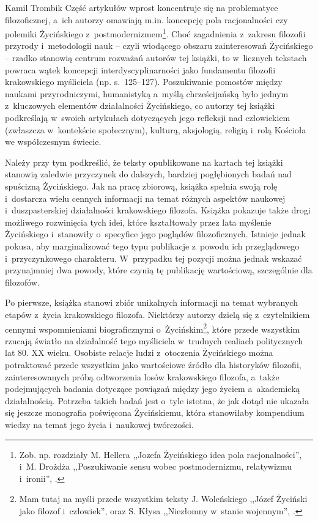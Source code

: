 \begin{recplenv}{Kamil Trombik}
Część artykułów wprost koncentruje się na problematyce filozoficznej, a~ich autorzy omawiają m.in. koncepcję pola racjonalności czy polemiki Życińskiego z~postmodernizmem\footnote{Zob. np. rozdziały M. Hellera ,,Jozefa Życińskiego idea pola racjonalności'',
\parencite[][]{heller_jozefa_2017}%
 i~M. Drożdża ,,Poszukiwanie sensu wobec postmodernizmu, relatywizmu i~ironii'', 
\parencite[][]{drozdz_poszukiwanie_2017}.%
}. Choć zagadnienia z~zakresu filozofii przyrody i~metodologii nauk -- czyli wiodącego obszaru zainteresowań Życińskiego -- rzadko stanowią centrum rozważań autorów tej książki, to w~licznych tekstach powraca wątek koncepcji interdyscyplinarności jako fundamentu filozofii krakowskiego myśliciela (np. s.~125–127). Poszukiwanie pomostów między naukami przyrodniczymi, humanistyką a~myślą chrześcijańską było jednym z~kluczowych elementów działalności Życińskiego, co autorzy tej książki podkreślają w~swoich artykułach dotyczących jego refleksji nad człowiekiem (zwłaszcza w~kontekście społecznym), kulturą, aksjologią, religią i~rolą Kościoła we współczesnym świecie.

Należy przy tym podkreślić, że teksty opublikowane na kartach tej książki stanowią zaledwie przyczynek do dalszych, bardziej pogłębionych badań nad spuścizną Życińskiego. Jak na pracę zbiorową, książka spełnia swoją rolę i~dostarcza wielu cennych informacji na temat różnych aspektów naukowej i~duszpasterskiej działalności krakowskiego filozofa. Książka pokazuje także drogi możliwego rozwinięcia tych idei, które kształtowały przez lata myślenie Życińskiego i~stanowiły o~specyfice jego poglądów filozoficznych. Istnieje jednak pokusa, aby marginalizować tego typu publikacje z~powodu ich przeglądowego i~przyczynkowego charakteru. W~przypadku tej pozycji można jednak wskazać przynajmniej dwa powody, które czynią tę publikację wartościową, szczególnie dla filozofów.

Po pierwsze, książka stanowi zbiór unikalnych informacji na temat wybranych etapów z~życia krakowskiego filozofa. Niektórzy autorzy dzielą się z~czytelnikiem cennymi wspomnieniami biograficznymi o~Życińskim\footnote{Mam tutaj na myśli przede wszystkim teksty J. Woleńskiego ,,Józef Życiński jako filozof i~człowiek'', oraz S. Kłysa ,,Niezłomny w~stanie wojennym'',
\parencites[][]{wolenski_jozef_2017}[][]{klys_niezlomny_2017}.%
}, które przede wszystkim rzucają światło na działalność tego myśliciela w~trudnych realiach politycznych lat 80. XX wieku. Osobiste relacje ludzi z~otoczenia Życińskiego można potraktować przede wszystkim jako wartościowe źródło dla historyków filozofii, zainteresowanych próbą odtworzenia losów krakowskiego filozofa, a~także podejmujących badania dotyczące powiązań między jego życiem a~akademicką działalnością. Potrzeba takich badań jest o~tyle istotna, że jak dotąd nie ukazała się jeszcze monografia poświęcona Życińskiemu, która stanowiłaby kompendium wiedzy na temat jego życia i~naukowej twórczości.


\end{recplenv}
